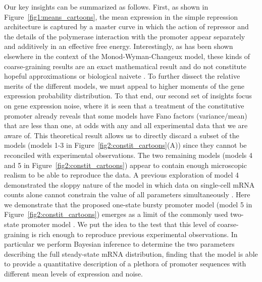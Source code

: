 Our key insights can be summarized as follows. First, as shown in
Figure~\ref{fig1:means_cartoons}, the mean expression in the simple repression
architecture is captured by a master curve in which the action of repressor and
the details of the polymerase interaction with the promoter appear separately
and additively in an effective free energy. Interestingly, as has been shown
elsewhere in the context of the Monod-Wyman-Changeux model, these kinds of
coarse-graining results are an exact mathematical result and do not constitute
hopeful approximations or biological naivete \cite{Razo-Mejia2018, Chure2019}.
To further dissect the relative merits of the different models, we must appeal
to higher moments of the gene expression probability distribution. To that end,
our second set of insights focus on gene expression noise, where it is seen that
a treatment of the constitutive promoter already reveals that some models have
Fano factors (variance/mean) that are less than one, at odds with any and all
experimental data that we are aware of\cite{So2011, Jones2014}. This theoretical
result allows us to directly discard a subset of the models (models 1-3 in
Figure~\ref{fig2:constit_cartoons}(A)) since they cannot be reconciled with
experimental observations. The two remaining models (models 4 and 5 in
Figure~\ref{fig2:constit_cartoons}) appear to contain enough microscopic realism
to be able to reproduce the data. A previous exploration of model 4 demonstrated
the sloppy nature of the model in which data on single-cell mRNA counts alone
cannot constrain the value of all parameters simultaneously
\cite{Razo-Mejia2020}. Here we demonstrate that the proposed one-state bursty
promoter model (model 5 in Figure~\ref{fig2:constit_cartoons}) emerges as  a
limit of the commonly used two-state promoter model \cite{Peccoud1995,
Shahrezaei2008, So2011, Sanchez2013, Jones2014}. We put the idea to the test
that this level of coarse-graining is rich enough to reproduce previous
experimental observations. In particular we perform Bayesian inference to
determine the two parameters describing the full steady-state mRNA distribution,
finding that the model is able to provide a quantitative description of a
plethora of promoter sequences with different mean levels of expression and
noise.

